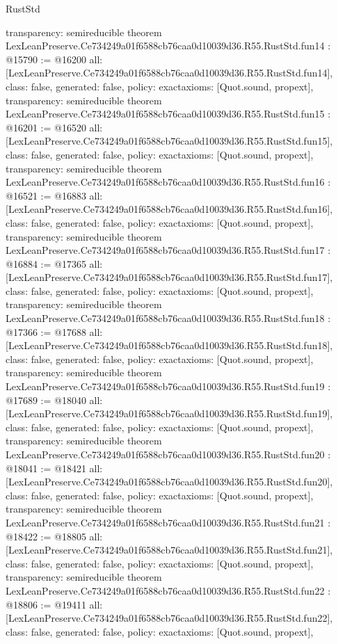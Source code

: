 \begin{lexlean}{RustStd}
\begin{coremodule}
{  transparency: semireducible
}
theorem LexLeanPreserve.Ce734249a01f6588cb76caa0d10039d36.R55.RustStd.fun14 : @15790 := @16200 {
  all: [LexLeanPreserve.Ce734249a01f6588cb76caa0d10039d36.R55.RustStd.fun14],
  class: false,
  generated: false,
  policy: exact{axioms: [Quot.sound, propext]},
  transparency: semireducible
}
theorem LexLeanPreserve.Ce734249a01f6588cb76caa0d10039d36.R55.RustStd.fun15 : @16201 := @16520 {
  all: [LexLeanPreserve.Ce734249a01f6588cb76caa0d10039d36.R55.RustStd.fun15],
  class: false,
  generated: false,
  policy: exact{axioms: [Quot.sound, propext]},
  transparency: semireducible
}
theorem LexLeanPreserve.Ce734249a01f6588cb76caa0d10039d36.R55.RustStd.fun16 : @16521 := @16883 {
  all: [LexLeanPreserve.Ce734249a01f6588cb76caa0d10039d36.R55.RustStd.fun16],
  class: false,
  generated: false,
  policy: exact{axioms: [Quot.sound, propext]},
  transparency: semireducible
}
theorem LexLeanPreserve.Ce734249a01f6588cb76caa0d10039d36.R55.RustStd.fun17 : @16884 := @17365 {
  all: [LexLeanPreserve.Ce734249a01f6588cb76caa0d10039d36.R55.RustStd.fun17],
  class: false,
  generated: false,
  policy: exact{axioms: [Quot.sound, propext]},
  transparency: semireducible
}
theorem LexLeanPreserve.Ce734249a01f6588cb76caa0d10039d36.R55.RustStd.fun18 : @17366 := @17688 {
  all: [LexLeanPreserve.Ce734249a01f6588cb76caa0d10039d36.R55.RustStd.fun18],
  class: false,
  generated: false,
  policy: exact{axioms: [Quot.sound, propext]},
  transparency: semireducible
}
theorem LexLeanPreserve.Ce734249a01f6588cb76caa0d10039d36.R55.RustStd.fun19 : @17689 := @18040 {
  all: [LexLeanPreserve.Ce734249a01f6588cb76caa0d10039d36.R55.RustStd.fun19],
  class: false,
  generated: false,
  policy: exact{axioms: [Quot.sound, propext]},
  transparency: semireducible
}
theorem LexLeanPreserve.Ce734249a01f6588cb76caa0d10039d36.R55.RustStd.fun20 : @18041 := @18421 {
  all: [LexLeanPreserve.Ce734249a01f6588cb76caa0d10039d36.R55.RustStd.fun20],
  class: false,
  generated: false,
  policy: exact{axioms: [Quot.sound, propext]},
  transparency: semireducible
}
theorem LexLeanPreserve.Ce734249a01f6588cb76caa0d10039d36.R55.RustStd.fun21 : @18422 := @18805 {
  all: [LexLeanPreserve.Ce734249a01f6588cb76caa0d10039d36.R55.RustStd.fun21],
  class: false,
  generated: false,
  policy: exact{axioms: [Quot.sound, propext]},
  transparency: semireducible
}
theorem LexLeanPreserve.Ce734249a01f6588cb76caa0d10039d36.R55.RustStd.fun22 : @18806 := @19411 {
  all: [LexLeanPreserve.Ce734249a01f6588cb76caa0d10039d36.R55.RustStd.fun22],
  class: false,
  generated: false,
  policy: exact{axioms: [Quot.sound, propext]},
}
\end{coremodule}
\end{lexlean}
